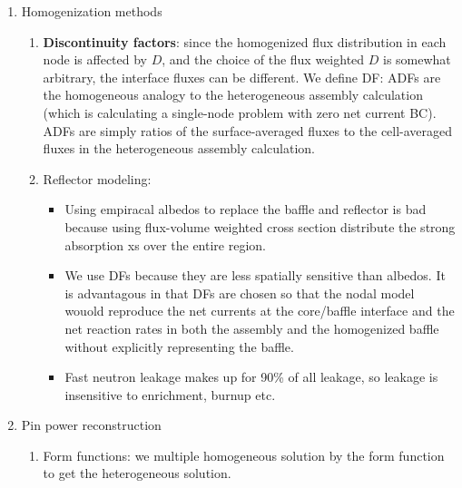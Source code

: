 \documentclass{school-22.211-notes}
\begin{document}
\begin{enumerate}
\clearpage
\item Homogenization methods
  \begin{enumerate}
    \item \textbf{Discontinuity factors}: since the homogenized flux distribution in each node is affected by $D$, and the choice of the flux weighted $D$ is somewhat arbitrary, the interface fluxes can be different. We define DF: 
      ADFs are the homogeneous analogy to the heterogeneous assembly calculation (which is calculating a single-node problem with zero net current BC). ADFs are simply ratios of the surface-averaged fluxes to the cell-averaged fluxes in the heterogeneous assembly calculation.

    \item Reflector modeling: 
      \begin{itemize}
      \item Using empiracal albedos to replace the baffle and reflector is bad because using flux-volume weighted cross section distribute the strong absorption xs over the entire region. 
      \item We use DFs because they are less spatially sensitive than albedos. It is advantagous in that DFs are chosen so that the nodal model wouold reproduce the net currents at the core/baffle interface and the net reaction rates in both the assembly and the homogenized baffle without explicitly representing the baffle. 
      \item Fast neutron leakage makes up for 90\% of all leakage, so leakage is insensitive to enrichment, burnup etc. 
      \end{itemize}
  \end{enumerate}

\item Pin power reconstruction
  \begin{enumerate}
    \item Form functions: we multiple homogeneous solution by the form function to get the heterogeneous solution. 


\end{enumerate}
\end{enumerate}
\end{document}
